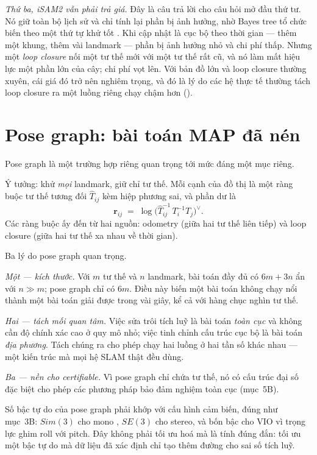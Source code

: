 \documentclass[../../vslam.tex]{subfiles}
\begin{document}
\emph{Thứ ba, iSAM2 vẫn phải trả giá.} Đây là câu trả lời cho câu hỏi mở đầu thứ tư. Nó giữ toàn bộ lịch sử và chỉ tính lại phần bị ảnh hưởng, nhờ Bayes tree tổ chức biến theo một thứ tự khử tốt \cite{kaess2012isam2}. Khi cập nhật là cục bộ theo thời gian --- thêm một khung, thêm vài landmark --- phần bị ảnh hưởng nhỏ và chi phí thấp. Nhưng một \emph{loop closure} nối một tư thế mới với một tư thế rất cũ, và nó làm mất hiệu lực một phần lớn của cây; chi phí vọt lên. Với bản đồ lớn và loop closure thường xuyên, cái giá đó trở nên nghiêm trọng, và đó là lý do các hệ thực tế thường tách loop closure ra một luồng riêng chạy chậm hơn ().

\section{Pose graph: bài toán MAP đã nén}

Pose graph là một trường hợp riêng quan trọng tới mức đáng một mục riêng.

Ý tưởng: khử \emph{mọi} landmark, giữ chỉ tư thế. Mỗi cạnh của đồ thị là một ràng buộc tư thế tương đối \(\hat{T}_{ij}\) kèm hiệp phương sai, và phần dư là
\[
\mathbf{r}_{ij} \;=\; \log\bigl(\hat{T}_{ij}^{-1}\,T_i^{-1}T_j\bigr)^{\vee}.
\]
Các ràng buộc ấy đến từ hai nguồn: odometry (giữa hai tư thế liên tiếp) và loop closure (giữa hai tư thế xa nhau về thời gian).

Ba lý do pose graph quan trọng.

\emph{Một --- kích thước.} Với \(m\) tư thế và \(n\) landmark, bài toán đầy đủ có \(6m + 3n\) ẩn với \(n \gg m\); pose graph chỉ có \(6m\). Điều này biến một bài toán không chạy nổi thành một bài toán giải được trong vài giây, kể cả với hàng chục nghìn tư thế.

\emph{Hai --- tách mối quan tâm.} Việc sửa trôi tích luỹ là bài toán \emph{toàn cục} và không cần độ chính xác cao ở quy mô nhỏ; việc tinh chỉnh cấu trúc cục bộ là bài toán \emph{địa phương}. Tách chúng ra cho phép chạy hai luồng ở hai tần số khác nhau --- một kiến trúc mà mọi hệ SLAM thật đều dùng.

\emph{Ba --- nền cho certifiable.} Vì pose graph chỉ chứa tư thế, nó có cấu trúc đại số đặc biệt cho phép các phương pháp bảo đảm nghiệm toàn cục (mục~5B).

Số bậc tự do của pose graph phải khớp với cấu hình cảm biến, đúng như  mục~3B: \(Sim(3)\) cho mono \cite{strasdat2010scaledrift}, \(SE(3)\) cho stereo, và bốn bậc cho VIO vì trọng lực ghim roll với pitch. Đây không phải tối ưu hoá mà là tính đúng đắn: tối ưu một bậc tự do mà dữ liệu đã xác định chỉ tạo thêm đường cho sai số tích luỹ.
\end{document}
